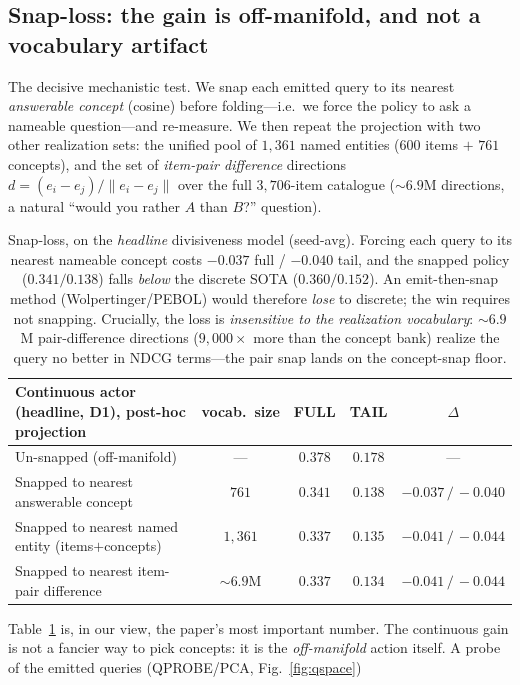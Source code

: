 \documentclass[11pt]{article}
\begin{document}
\subsection{Snap-loss: the gain is off-manifold, and not a vocabulary artifact}\label{sec:snaploss}
The decisive mechanistic test. We snap each emitted query to its nearest \emph{answerable concept} (cosine) before
folding---i.e.\ we force the policy to ask a nameable question---and re-measure. We then repeat the projection with two
other realization sets: the unified pool of $1{,}361$ named entities ($600$ items $+$ $761$ concepts), and the set of
\emph{item-pair difference} directions $d=(e_i-e_j)/\|e_i-e_j\|$ over the full $3{,}706$-item catalogue
(${\sim}6.9$M directions, a natural ``would you rather $A$ than $B$?'' question).
\begin{table}[h]\centering
\begin{tabular}{lcccc}
\toprule
Continuous actor (headline, D1), post-hoc projection & vocab.\ size & FULL & TAIL & $\Delta$ \\
\midrule
Un-snapped (off-manifold) & --- & $0.378$ & $0.178$ & --- \\
Snapped to nearest answerable concept & $761$ & $0.341$ & $0.138$ & $-0.037\,/\,-0.040$ \\
Snapped to nearest named entity (items$+$concepts) & $1{,}361$ & $0.337$ & $0.135$ & $-0.041\,/\,-0.044$ \\
Snapped to nearest item-pair difference & ${\sim}6.9$M & $0.337$ & $0.134$ & $-0.041\,/\,-0.044$ \\
\bottomrule
\end{tabular}
\caption{Snap-loss, on the \emph{headline} divisiveness model (seed-avg). Forcing each query to its nearest nameable
concept costs $-0.037$ full / $-0.040$ tail, and the snapped policy ($0.341/0.138$) falls \emph{below} the discrete SOTA
($0.360/0.152$). An emit-then-snap method (Wolpertinger/PEBOL) would therefore \emph{lose} to discrete; the win requires
not snapping. Crucially, the loss is \emph{insensitive to the realization vocabulary}: ${\sim}6.9$M pair-difference
directions ($9{,}000\times$ more than the concept bank) realize the query no better in NDCG terms---the pair snap lands
on the concept-snap floor.}\label{tab:snaploss}
\end{table}
Table~\ref{tab:snaploss} is, in our view, the paper's most important number. The continuous gain is not a fancier way to
pick concepts: it is the \emph{off-manifold} action itself. A probe of the emitted queries (QPROBE/PCA, Fig.~\ref{fig:qspace})
\end{document}
